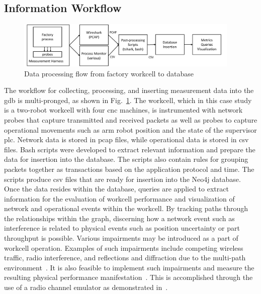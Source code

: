 \subsection{Information Workflow}

\begin{figure}[!ht]
    \centering
    \includegraphics[width=0.95\textwidth]{./chapter-gdb-appl/figures/database/work-flow.pdf}
    \caption{Data processing flow from factory workcell to database}
    \label{gdbappl:fig::work-flow}
\end{figure}

The workflow for collecting, processing, and inserting measurement data into the \gls{gdb} is multi-pronged, as shown in Fig.~\ref{gdbappl:fig::work-flow}.  The workcell, which in this case study is a two-robot workcell with four \gls{cnc} machines, is instrumented with network probes that capture transmitted and received packets as well as probes to capture operational movements such as arm robot position and the state of the supervisor \gls{plc}.  Network data is stored in \gls{pcap} files, while operational data is stored in \gls{csv} files. Bash scripts were developed to extract relevant information and prepare the data for insertion into the database. The scripts also contain rules for grouping packets together as transactions based on the application protocol and time. The scripts produce \gls{csv} files that are ready for insertion into the Neo4j database.  Once the data resides within the database, queries are applied to extract information for the evaluation of workcell performance and visualization of network and operational events within the workcell. By tracking paths through the relationships within the graph, discerning how a network event such as interference is related to physical events such as position uncertainty or part throughput is possible. Various impairments may be introduced as a part of workcell operation.  Examples of such impairments include competing wireless traffic, radio interference, and reflections and diffraction due to the multi-path environment~\cite{Candell2017.NIST1951}. It is also feasible to implement such impairments and measure the resulting physical performance manifestation~\cite{Liu2019vancouver}. This is accomplished through the use of a radio channel emulator as demonstrated in~\cite{CandellISIE2019.Conf}.

